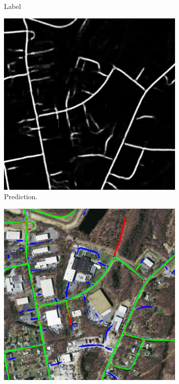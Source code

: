 \begin{figure}[H]
\begin{subfigure}{0.23\textwidth}
\caption{Label}
\vspace{0.2cm} %
\end{subfigure}
\hspace*{\fill} %
\begin{subfigure}{0.23\textwidth}
\includegraphics[width=\textwidth]{figs/appendix/pred11728825_15.jpg}
\caption{Prediction.}
\vspace{0.2cm} %
\end{subfigure}
\hspace*{\fill} %
\begin{subfigure}{0.23\textwidth}
\includegraphics[width=\textwidth]{figs/appendix/hit11728825_15.jpg}

\end{subfigure}
\end{figure}
